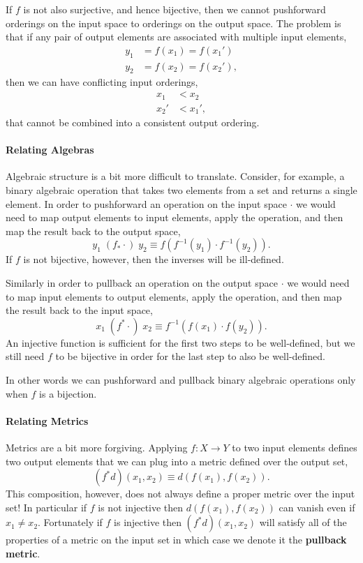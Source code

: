 \documentclass[
  letterpaper,
  DIV=11,
  numbers=noendperiod]{scrartcl}
\let\oldparagraph\paragraph
\renewcommand{\paragraph}[1]{\oldparagraph{#1}\mbox{}}
\begin{document}
If \(f\) is not also surjective, and hence bijective, then we cannot
pushforward orderings on the input space to orderings on the output
space. The problem is that if any pair of output elements are associated
with multiple input elements, \begin{align*}
y_{1} &= f(x_1) = f(x_1')
\\
y_{2} &= f(x_2) = f(x_2'),
\end{align*} then we can have conflicting input orderings,
\begin{align*}
x_1 &< x_2
\\
x_2' &< x_1',
\end{align*} that cannot be combined into a consistent output ordering.

\hypertarget{relating-algebras}{%
\paragraph{Relating Algebras}\label{relating-algebras}}

Algebraic structure is a bit more difficult to translate. Consider, for
example, a binary algebraic operation that takes two elements from a set
and returns a single element. In order to pushforward an operation on
the input space \(\cdot\) we would need to map output elements to input
elements, apply the operation, and then map the result back to the
output space, \[
y_1 \; (f_{*} \cdot) \; y_2 \equiv f \left( f^{-1}(y_1) \cdot f^{-1}(y_2) \right).
\] If \(f\) is not bijective, however, then the inverses will be
ill-defined.

Similarly in order to pullback an operation on the output space
\(\cdot\) we would need to map input elements to output elements, apply
the operation, and then map the result back to the input space, \[
x_1 \; (f^{*} \cdot) \; x_2 \equiv f^{-1} \left( f(x_1) \cdot f(y_2) \right).
\] An injective function is sufficient for the first two steps to be
well-defined, but we still need \(f\) to be bijective in order for the
last step to also be well-defined.

In other words we can pushforward and pullback binary algebraic
operations only when \(f\) is a bijection.

\hypertarget{relating-metrics}{%
\paragraph{Relating Metrics}\label{relating-metrics}}

Metrics are a bit more forgiving. Applying \(f : X \rightarrow Y\) to
two input elements defines two output elements that we can plug into a
metric defined over the output set, \[
(f^{*} d)(x_1, x_2) \equiv d(f(x_1), f(x_2)).
\] This composition, however, does not always define a proper metric
over the input set! In particular if \(f\) is not injective then
\(d(f(x_1), f(x_2))\) can vanish even if \(x_1 \ne x_2\). Fortunately if
\(f\) is injective then \((f^{*} d)(x_1, x_2)\) will satisfy all of the
properties of a metric on the input set in which case we denote it the
\textbf{pullback metric}.
\end{document}
